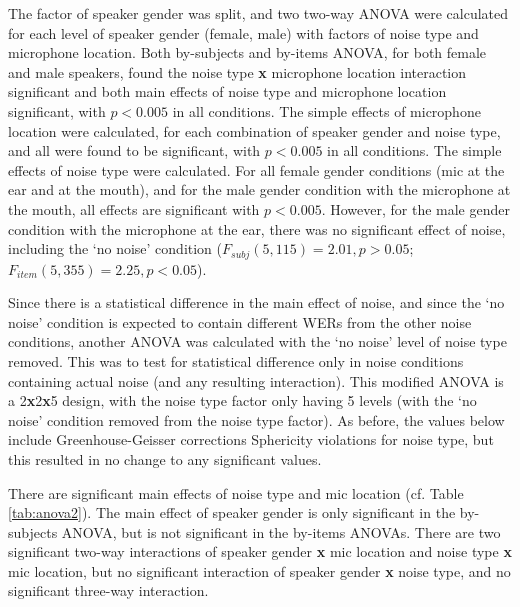 The factor of speaker gender was split, and two two-way ANOVA were calculated for each level of speaker gender (female, male) with factors of noise type and microphone location.  Both by-subjects and by-items ANOVA, for both female and male speakers, found the noise type \textbf{x} microphone location interaction significant and both main effects of noise type and microphone location significant, with $p<0.005$ in all conditions.  The simple effects of microphone location were calculated, for each combination of speaker gender and noise type, and all were found to be significant, with $p<0.005$ in all conditions.  The simple effects of noise type were calculated.  For all female gender conditions (mic at the ear and at the mouth), and for the male gender condition with the microphone at the mouth, all effects are significant with $p<0.005$.  However, for the male gender condition with the microphone at the ear, there was no significant effect of noise, including the `no noise' condition ($F_{subj}(5,115)=2.01, p>0.05$; $F_{item}(5,355)=2.25, p<0.05$).

Since there is a statistical difference in the main effect of noise, and since the `no noise' condition is expected to contain different WERs from the other noise conditions, another ANOVA was calculated with the `no noise' level of noise type removed.  This was to test for \DIFaddbegin {}\DIFaddend statistical difference only in noise conditions containing actual noise (and any resulting interaction). This modified ANOVA is a 2\textbf{x}2\textbf{x}5 design, with the noise type factor only having 5 levels (with the `no noise' condition removed from the noise type factor).  As before, the values below include Greenhouse-Geisser corrections \DIFdelbegin {}\DIFdelend \DIFaddbegin {}\DIFaddend Sphericity violations for noise type, but this resulted in no change to any significant values.

There are significant main effects of noise type and mic location (cf. Table \ref{tab:anova2}).  The main effect of speaker gender is only significant in the by-subjects ANOVA, but is not significant in the by-items ANOVAs.  There are two significant two-way interactions of speaker gender \textbf{x} mic location and noise type \textbf{x} mic location, but no significant interaction of speaker gender \textbf{x} noise type, and no significant three-way interaction.  

